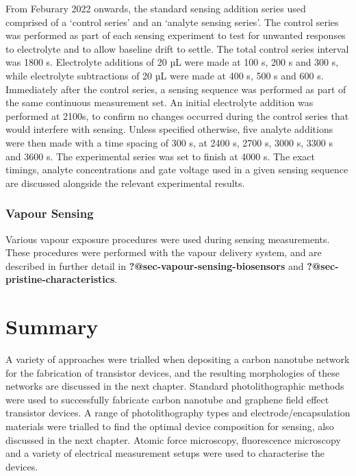 \documentclass[
  a4paper,
]{scrbook}
\begin{document}
From Feburary 2022 onwards, the standard sensing addition series used
comprised of a `control series' and an `analyte sensing series'. The
control series was performed as part of each sensing experiment to test
for unwanted responses to electrolyte and to allow baseline drift to
settle. The total control series interval was 1800 s. Electrolyte
additions of 20 µL were made at 100 s, 200 s and 300 s, while
electrolyte subtractions of 20 µL were made at 400 s, 500 s and 600 s.
Immediately after the control series, a sensing sequence was performed
as part of the same continuous measurement set. An initial electrolyte
addition was performed at 2100s, to confirm no changes occurred during
the control series that would interfere with sensing. Unless specified
otherwise, five analyte additions were then made with a time spacing of
300 s, at 2400 s, 2700 s, 3000 s, 3300 s and 3600 s. The experimental
series was set to finish at 4000 s. The exact timings, analyte
concentrations and gate voltage used in a given sensing sequence are
discussed alongside the relevant experimental results.

\hypertarget{vapour-sensing}{%
\subsubsection*{Vapour Sensing}\label{vapour-sensing}}

Various vapour exposure procedures were used during sensing
measurements. These procedures were performed with the vapour delivery
system, and are described in further detail in
\textbf{?@sec-vapour-sensing-biosensors} and
\textbf{?@sec-pristine-characteristics}.

\hypertarget{summary}{%
\section{Summary}\label{summary}}

A variety of approaches were trialled when depositing a carbon nanotube
network for the fabrication of transistor devices, and the resulting
morphologies of these networks are discussed in the next chapter.
Standard photolithographic methods were used to successfully fabricate
carbon nanotube and graphene field effect transistor devices. A range of
photolithography types and electrode/encapsulation materials were
trialled to find the optimal device composition for sensing, also
discussed in the next chapter. Atomic force microscopy, fluorescence
microscopy and a variety of electrical measurement setups were used to
characterise the devices.
\end{document}
